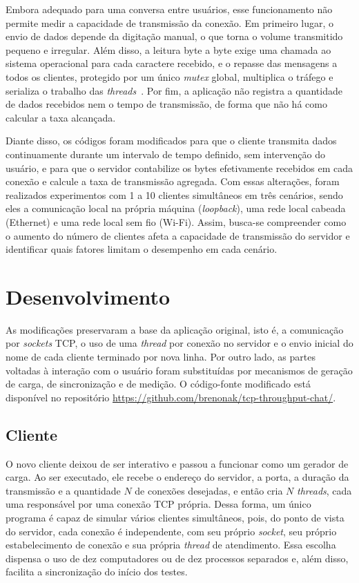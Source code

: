 \documentclass[12pt]{article}
\begin{document}
Embora adequado para uma conversa entre usuários, esse funcionamento não permite
medir a capacidade de transmissão da conexão. Em primeiro lugar, o envio de
dados depende da digitação manual, o que torna o volume transmitido pequeno e
irregular. Além disso, a leitura byte a byte exige uma chamada ao sistema
operacional para cada caractere recebido, e o repasse das mensagens a todos os
clientes, protegido por um único \textit{mutex} global, multiplica o tráfego e
serializa o trabalho das \textit{threads}~\cite{stevens:03,kerrisk:10}. Por fim, a aplicação não registra a
quantidade de dados recebidos nem o tempo de transmissão, de forma que não há
como calcular a taxa alcançada.

Diante disso, os códigos foram modificados para que o cliente transmita dados
continuamente durante um intervalo de tempo definido, sem intervenção do
usuário, e para que o servidor contabilize os bytes efetivamente recebidos em
cada conexão e calcule a taxa de transmissão agregada. Com essas alterações,
foram realizados experimentos com 1 a 10 clientes simultâneos em três cenários,
sendo eles a comunicação local na própria máquina (\textit{loopback}), uma rede
local cabeada (Ethernet) e uma rede local sem fio (Wi-Fi). Assim, busca-se compreender como o
aumento do número de clientes afeta a capacidade de transmissão do servidor e
identificar quais fatores limitam o desempenho em cada cenário.

\section{Desenvolvimento}\label{sec:desenvolvimento}

As modificações preservaram a base da aplicação original, isto é, a comunicação
por \textit{sockets} TCP, o uso de uma \textit{thread} por conexão no servidor e
o envio inicial do nome de cada cliente terminado por nova linha. Por outro
lado, as partes voltadas à interação com o usuário foram substituídas por
mecanismos de geração de carga, de sincronização e de medição. O código-fonte
modificado está disponível no repositório
\url{https://github.com/brenonak/tcp-throughput-chat/}.

\subsection{Cliente}

O novo cliente deixou de ser interativo e passou a funcionar como um gerador de
carga. Ao ser executado, ele recebe o endereço do servidor, a porta, a duração
da transmissão e a quantidade $N$ de conexões desejadas, e então cria $N$
\textit{threads}, cada uma responsável por uma conexão TCP própria. Dessa forma,
um único programa é capaz de simular vários clientes simultâneos, pois, do ponto
de vista do servidor, cada conexão é independente, com seu próprio
\textit{socket}, seu próprio estabelecimento de conexão e sua própria
\textit{thread} de atendimento. Essa escolha dispensa o uso de dez computadores
ou de dez processos separados e, além disso, facilita a sincronização do início
dos testes.
\end{document}
